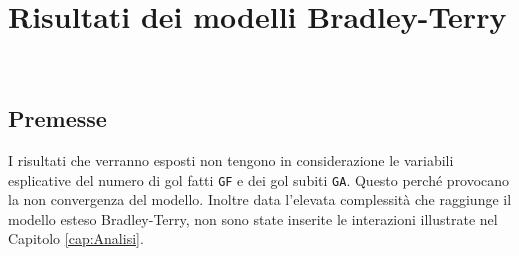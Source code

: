 
\chapter{Risultati dei modelli Bradley-Terry}
\label{cap:risultatiDM}

\\
\section{Premesse}
I risultati che verranno esposti non tengono in considerazione le variabili esplicative del numero di gol fatti \texttt{GF} e dei gol subiti \texttt{GA}. Questo perché provocano la non convergenza del modello. Inoltre data l'elevata complessità che raggiunge il modello esteso Bradley-Terry, non sono state inserite le interazioni illustrate nel Capitolo \ref{cap:Analisi}.


